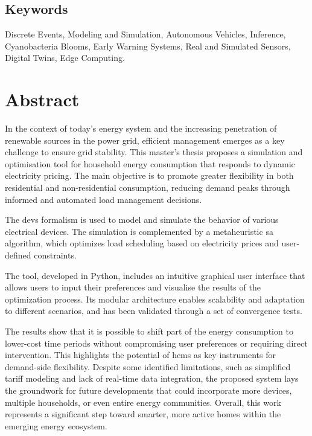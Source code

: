 \documentclass[11pt,a4paper]{book}
\begin{document}
\section*{Keywords}
\noindent Discrete Events, Modeling and Simulation, Autonomous Vehicles, Inference, Cyanobacteria Blooms, Early Warning Systems, Real and Simulated Sensors, Digital Twins, Edge Computing.








\chapter*{Abstract}
In the context of today’s energy system and the increasing penetration of renewable sources in the power grid, efficient management emerges as a key challenge to ensure grid stability. This master's thesis proposes a simulation and optimisation tool for household energy consumption that responds to dynamic electricity pricing. The main objective is to promote greater flexibility in both residential and non-residential consumption, reducing demand peaks through informed and automated load management decisions.

The \gls{devs} formalism is used to model and simulate the behavior of various electrical devices. The simulation is complemented by a metaheuristic \gls{sa} algorithm, which optimizes load scheduling based on electricity prices and user-defined constraints.

The tool, developed in Python, includes an intuitive graphical user interface that allows users to input their preferences and visualise the results of the optimization process. Its modular architecture enables scalability and adaptation to different scenarios, and has been validated through a set of convergence tests.

The results show that it is possible to shift part of the energy consumption to lower-cost time periods without compromising user preferences or requiring direct intervention. This highlights the potential of \gls{hems} as key instruments for demand-side flexibility. Despite some identified limitations, such as simplified tariff modeling and lack of real-time data integration, the proposed system lays the groundwork for future developments that could incorporate more devices, multiple households, or even entire energy communities. Overall, this work represents a significant step toward smarter, more active homes within the emerging energy ecosystem.
\end{document}

